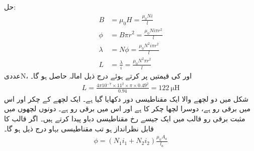 حل:
\begin{align*}
B&=\mu_0 H=\frac{\mu_0 N i}{l}\\
\phi&=B  \pi r^2=\frac{\mu_0 N i \pi r^2}{l}\\ 
\lambda&=N \phi =\frac{\mu_0 N^2 i \pi r^2}{l}\\ 
L&=\frac{\lambda}{i}=\frac{\mu_0 N^2 \pi r^2}{l}
\end{align*} 
عددی{N}،  اور  کی قیمتیں پر کرتے ہوئے درج ذیل امالہ حاصل ہو گا۔
\begin{align*}
L=\frac{4 \pi 10^{-7} \times 11^2 \times \pi  \times 0.49^2}{0.94}=\SI{122}{\micro \henry}
\end{align*}
%
شکل  میں دو لچھے والا ایک مقناطیسی دور دکھایا گیا ہے۔ ایک لچھے کے چکر    اور اس میں برقی رو  ہے،  دوسرا لچھا  چکر کا ہے اور اس میں برقی  رو  ہے۔ دونوں لچھوں میں مثبت برقی رو قالب میں ایک جیسے  رخ  مقناطیسی دباو  پیدا کرتے ہیں۔ اگر قالب کا  قابل نظرانداز ہو تب مقناطیسی بہاو درج ذیل ہو گا۔
\begin{align}
\phi=\left (N_1 i_1 +N_2 i_2 \right ) \frac{\mu_0 A_a}{l_a}
\end{align} 
%
